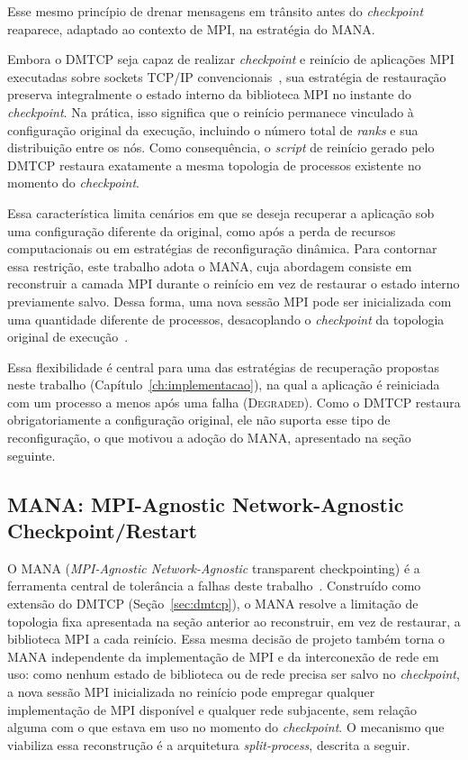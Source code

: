 Esse mesmo princípio de drenar mensagens em trânsito antes do \textit{checkpoint} reaparece,
adaptado ao contexto de MPI, na estratégia do MANA.

Embora o DMTCP seja capaz de realizar \textit{checkpoint} e reinício de aplicações MPI executadas
sobre sockets TCP/IP convencionais~\cite{ansel2009dmtcp}, sua estratégia de
restauração preserva integralmente o estado interno da biblioteca MPI no instante
do \textit{checkpoint}. Na prática, isso significa que o reinício permanece vinculado à configuração
original da execução, incluindo o número total de \textit{ranks} e sua distribuição
entre os nós. Como consequência, o \textit{script} de reinício gerado pelo DMTCP
restaura exatamente a mesma topologia de processos existente no momento do \textit{checkpoint}.

Essa característica limita cenários em que se deseja recuperar a aplicação
sob uma configuração diferente da original, como após a perda de recursos computacionais
ou em estratégias de reconfiguração dinâmica. Para contornar essa restrição,
este trabalho adota o MANA, cuja abordagem consiste em reconstruir a camada
MPI durante o reinício em vez de restaurar o estado interno previamente salvo.
Dessa forma, uma nova sessão MPI pode ser inicializada com uma quantidade diferente
de processos, desacoplando o \textit{checkpoint} da topologia original de execução~\cite{garg2019mana}.

Essa flexibilidade é central para uma das estratégias de recuperação propostas neste
trabalho (Capítulo~\ref{ch:implementacao}), na qual a aplicação é reiniciada com um
processo a menos após uma falha (\textsc{Degraded}). Como o DMTCP restaura
obrigatoriamente a configuração original, ele não suporta esse tipo de
reconfiguração, o que motivou a adoção do MANA, apresentado na seção seguinte.

\subsection{MANA: MPI-Agnostic Network-Agnostic Checkpoint/Restart}
\label{sec:mana}

O MANA (\textit{MPI-Agnostic Network-Agnostic} transparent checkpointing) é a
ferramenta central de tolerância a falhas deste trabalho~\cite{garg2019mana}.
Construído como extensão do DMTCP (Seção~\ref{sec:dmtcp}), o MANA resolve a limitação
de topologia fixa apresentada na seção anterior ao reconstruir, em vez de restaurar, a
biblioteca MPI a cada reinício. Essa mesma decisão de projeto também torna o MANA
independente da implementação de MPI e da interconexão de rede em uso: como nenhum
estado de biblioteca ou de rede precisa ser salvo no \textit{checkpoint}, a nova sessão MPI
inicializada no reinício pode empregar qualquer implementação de MPI disponível e
qualquer rede subjacente, sem relação alguma com o que estava em uso no momento do
\textit{checkpoint}. O mecanismo que viabiliza essa reconstrução é a arquitetura
\textit{split-process}, descrita a seguir.


